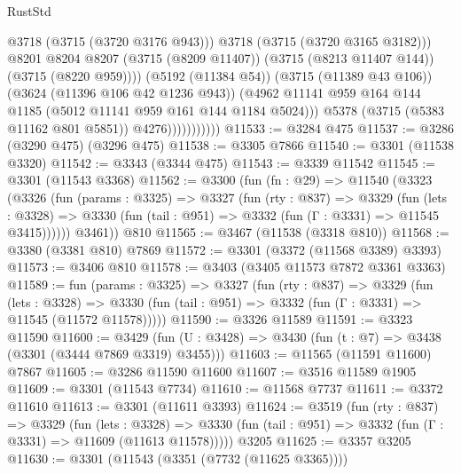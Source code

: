 \begin{lexlean}{RustStd}
\begin{coremodule}
                                    @3718
                                    (@3715 (@3720 @3176 @943)))
                                  @3718
                                  (@3715 (@3720 @3165 @3182)))
                                @8201
                                @8204
                                @8207
                                (@3715 (@8209 @11407))
                                (@3715 (@8213 @11407 @144))
                                (@3715 (@8220 @959))))
                            (@5192 (@11384 @54))
                            (@3715 (@11389 @43 @106))
                            (@3624 (@11396 @106 @42 @1236 @943))
                            (@4962
                              @11141
                              @959
                              @164
                              @144
                              @1185
                              (@5012 @11141 @959 @161 @144 @1184 @5024)))
                          @5378
                          (@3715 (@5383 @11162 @801 @5851))
                          @4276)))))))))))
@11533 := @3284 @475
@11537 := @3286 (@3290 @475) (@3296 @475)
@11538 := @3305 @7866
@11540 := @3301 (@11538 @3320)
@11542 := @3343 (@3344 @475)
@11543 := @3339 @11542
@11545 := @3301 (@11543 @3368)
@11562 := @3300
    (fun (fn : @29) =>
    @11540
      (@3323
        (@3326
          (fun (params : @3325) =>
          @3327
            (fun (rty : @837) =>
            @3329
              (fun (lets : @3328) =>
              @3330 (fun (tail : @951) => @3332 (fun (Γ : @3331) => @11545 @3415))))))
        @3461))
    @810
@11565 := @3467 (@11538 (@3318 @810))
@11568 := @3380 (@3381 @810) @7869
@11572 := @3301 (@3372 (@11568 @3389) @3393)
@11573 := @3406 @810
@11578 := @3403 (@3405 @11573 @7872 @3361 @3363)
@11589 := fun (params : @3325) =>
  @3327
    (fun (rty : @837) =>
    @3329
      (fun (lets : @3328) =>
      @3330 (fun (tail : @951) => @3332 (fun (Γ : @3331) => @11545 (@11572 @11578)))))
@11590 := @3326 @11589
@11591 := @3323 @11590
@11600 := @3429 (fun (U : @3428) => @3430 (fun (t : @7) => @3438 (@3301 (@3444 @7869 @3319) @3455)))
@11603 := @11565 (@11591 @11600) @7867
@11605 := @3286 @11590 @11600
@11607 := @3516 @11589 @1905
@11609 := @3301 (@11543 @7734)
@11610 := @11568 @7737
@11611 := @3372 @11610
@11613 := @3301 (@11611 @3393)
@11624 := @3519
    (fun (rty : @837) =>
    @3329
      (fun (lets : @3328) =>
      @3330 (fun (tail : @951) => @3332 (fun (Γ : @3331) => @11609 (@11613 @11578)))))
    @3205
@11625 := @3357 @3205
@11630 := @3301 (@11543 (@3351 (@7732 (@11625 @3365))))

\end{coremodule}
\end{lexlean}
